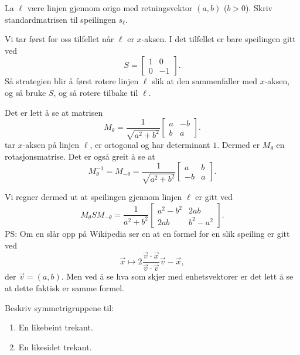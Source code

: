 \documentclass[11pt, norsk]{article}
\begin{document}
\begin{oppg}
La $\ell$ være linjen gjennom origo med retningsvektor $(a,b)$ ($b > 0$). Skriv standardmatrisen til speilingen $s_{\ell}$. 
\end{oppg}
\begin{losn}
Vi tar først for oss tilfellet når $\ell$ er $x$-aksen. I det tilfellet er bare speilingen gitt ved 
$$ 
S = \begin{bmatrix}
1 & 0 \\ 0 & -1
\end{bmatrix}.
$$
Så strategien blir å først rotere linjen $\ell$ slik at den sammenfaller med $x$-aksen, og så bruke $S$, og så rotere tilbake til $\ell$.

Det er lett å se at matrisen 
$$ 
M_\theta = \frac{1}{\sqrt{a^2+b^2}} \begin{bmatrix}
a & -b \\ b & a
\end{bmatrix}.
$$
tar $x$-aksen på linjen $\ell$, er ortogonal og har determinant $1$. Dermed er $M_\theta$ en rotasjonsmatrise. Det er også greit å se at
$$ 
M_\theta^{-1} = M_{-\theta} = \frac{1}{\sqrt{a^2+b^2}} \begin{bmatrix}
a & b \\ -b & a
\end{bmatrix}.
$$

Vi regner dermed ut at speilingen gjennom linjen $\ell$ er gitt ved
$$
M_\theta S M_{-\theta} = \frac{1}{a^2+b^2} \begin{bmatrix}
a^2-b^2 & 2ab \\ 
2ab & b^2-a^2
\end{bmatrix}.
$$
PS: Om en slår opp på Wikipedia ser en at en formel for en slik speiling er gitt ved 
$$
\vec x \mapsto 2 \frac{\vec v \cdot \vec x}{\vec v \cdot \vec v} \vec v - \vec x,
$$
der $\vec v = (a,b)$. Men ved å se hva som skjer med enhetsvektorer er det lett å se at dette faktisk er samme formel.
\end{losn}

\begin{oppg}
Beskriv symmetrigruppene til:
\begin{enumerate}[a]
\item En likebeint trekant.
\item En likesidet trekant.
\end{enumerate}
\end{oppg}
\end{document}
